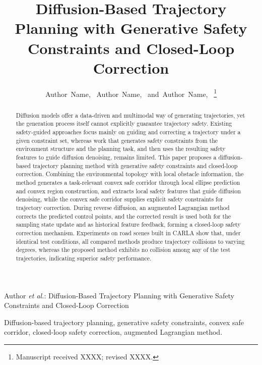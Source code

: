 \documentclass[journal]{IEEEtran}
\begin{document}
\title{Diffusion-Based Trajectory Planning with Generative Safety
Constraints and Closed-Loop Correction}

\author{Author~Name,~
        Author~Name,~
        and~Author~Name,~%
\thanks{Manuscript received XXXX; revised XXXX.}}

%
{Author \MakeLowercase{\textit{et al.}}: Diffusion-Based Trajectory
Planning with Generative Safety Constraints and Closed-Loop Correction}

\maketitle

\begin{abstract}
Diffusion models offer a data-driven and multimodal way of generating
trajectories, yet the generation process itself cannot explicitly guarantee
trajectory safety. Existing safety-guided approaches focus mainly on guiding
and correcting a trajectory under a given constraint set, whereas work that
generates safety constraints from the environment structure and the planning
task, and then uses the resulting safety features to guide diffusion
denoising, remains limited. This paper proposes a diffusion-based trajectory
planning method with generative safety constraints and closed-loop
correction. Combining the environmental topology with local obstacle
information, the method generates a task-relevant convex safe corridor
through local ellipse prediction and convex region construction, and extracts
local safety features that guide diffusion denoising, while the convex safe
corridor supplies explicit safety constraints for trajectory correction.
During reverse diffusion, an augmented Lagrangian method corrects the
predicted control points, and the corrected result is used both for the
sampling state update and as historical feature feedback, forming a
closed-loop safety correction mechanism. Experiments on road scenes built in
CARLA show that, under identical test conditions, all compared methods
produce trajectory collisions to varying degrees, whereas the proposed method
exhibits no collision among any of the test trajectories, indicating superior
safety performance.
\end{abstract}

\begin{IEEEkeywords}
Diffusion-based trajectory planning, generative safety constraints, convex
safe corridor, closed-loop safety correction, augmented Lagrangian method.
\end{IEEEkeywords}
\end{document}
